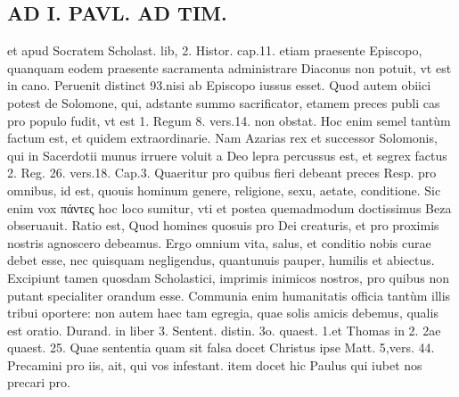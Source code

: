 \documentclass{article}
\begin{document}
\begin{pages}
\section*{AD I. PAVL. AD TIM. }
\marginpar{[ p.44 ]}\pstart et apud Socratem Scholast. lib, 2. Histor. cap.11. etiam praesente Episcopo, quanquam eodem praesente sacramenta administrare Diaconus non potuit, vt est in cano. Peruenit distinct 93.nisi ab Episcopo iussus esset.  \pend\pstart Quod autem obiici potest de Solomone, qui, adstante summo sacrificator, etamem preces publi cas pro populo fudit, vt est 1. Regum 8. vers.14. non obstat. Hoc enim semel tantùm factum est, et quidem extraordinarie. Nam Azarias rex et successor Solomonis, qui in Sacerdotii munus irruere voluit a Deo lepra percussus est, et segrex factus 2. Reg. 26. vers.18.  \pend\pstart Cap.3. Quaeritur pro quibus fieri debeant preces Resp. pro omnibus, id est, quouis hominum genere, religione, sexu, aetate, conditione. Sic enim vox πάντες hoc loco sumitur, vti et postea quemadmodum doctissimus Beza obseruauit. Ratio est, Quod homines quosuis pro Dei creaturis, et pro proximis nostris agnoscero debeamus. Ergo omnium vita, salus, et conditio nobis curae debet esse, nec quisquam negligendus, quantunuis pauper, humilis et abiectus.  \pend\pstart Excipiunt tamen quosdam Scholastici, imprimis inimicos nostros, pro quibus non putant specialiter orandum esse. Communia enim humanitatis officia tantùm illis tribui oportere: non autem haec tam egregia, quae solis amicis debemus, qualis est oratio. Durand. in liber 3. Sentent. distin. 3o. quaest. 1.et Thomas in 2. 2ae quaest. 25. Quae sententia quam sit falsa docet Christus ipse Matt. 5,vers. 44. Precamini pro iis, ait, qui vos infestant. item docet hic Paulus qui iubet nos precari pro.  \pend

\end{pages}
\end{document}

